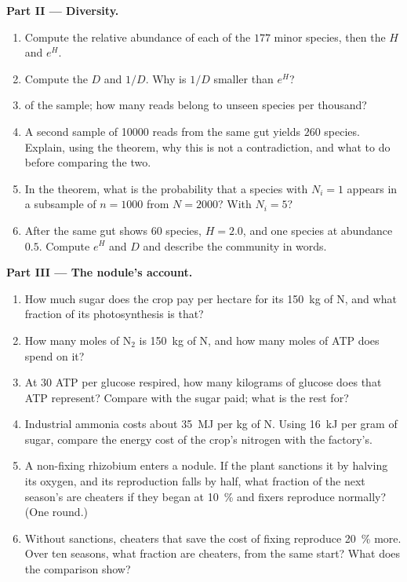 \begin{problem}
\medskip
\noindent\textbf{Part II --- Diversity.}
\begin{enumerate}[resume]
  \item Compute the relative abundance of each of the $177$ minor
        species, then the  $H$ and $e^{H}$.
  \item Compute the  $D$ and $1/D$. Why is $1/D$ smaller
        than $e^{H}$?
  \item {} of the sample; how many reads belong to unseen
        species per thousand?
  \item A second sample of \num{10000} reads from the same gut yields
        $260$ species. Explain, using the  theorem, why
        this is not a contradiction, and what to do before comparing
        the two.
  \item In the theorem, what is the probability that a species with
        $N_{i} = 1$ appears in a subsample of $n = 1000$ from $N =
        2000$? With $N_{i} = 5$?
  \item After  the same gut shows $60$ species, $H = 2.0$,
        and one species at abundance $0.5$. Compute $e^{H}$ and $D$ and
        describe the community in words.
\end{enumerate}

\medskip
\noindent\textbf{Part III --- The nodule's account.}
\begin{enumerate}[resume]
  \item How much sugar does the crop pay per hectare for its
        \qty{150}{kg} of N, and what fraction of its photosynthesis is
        that?
  \item How many moles of N$_{2}$ is \qty{150}{kg} of N, and how many
        moles of ATP does  spend on it?
  \item At $30$ ATP per glucose respired, how many kilograms of glucose
        does that ATP represent? Compare with the sugar paid; what is
        the rest for?
  \item Industrial ammonia costs about \qty{35}{MJ} per kg of N. Using
        \qty{16}{kJ} per gram of sugar, compare the energy cost of the
        crop's nitrogen with the factory's.
  \item A non-fixing rhizobium enters a nodule. If the plant sanctions
        it by halving its oxygen, and its reproduction falls by half,
        what fraction of the next season's  are cheaters if
        they began at \qty{10}{\%} and fixers reproduce normally?
        (One round.)
  \item Without sanctions, cheaters that save the cost of fixing
        reproduce \qty{20}{\%} more. Over ten seasons, what fraction are
        cheaters, from the same start? What does the comparison show?
\end{enumerate}


\end{problem}
